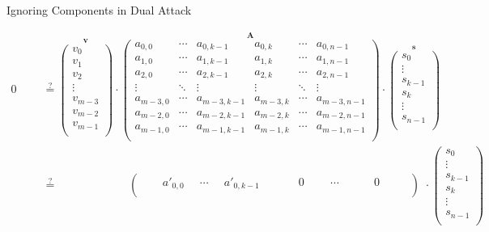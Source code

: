 \documentclass[presentation,smaller]{beamer}
\renewcommand{\vec}[1]{\ensuremath{\mathbf{#1}}\xspace}
\begin{document}
\begin{frame}[label={sec:org344f9d7}]{Ignoring Components in Dual Attack}
\begin{center}
\scriptsize
\begin{align*}
0 \phantom{xxi} &\stackrel{?}{=} \overset{\vec{v}}{\begin{pmatrix}
v_0\\
v_1\\
v_2\\
\vdots\\
v_{m-3}\\
v_{m-2}\\
v_{m-1}\\
\end{pmatrix}} \cdot 
\overset{\vec{A}}{
\left(\begin{array}{ccc|ccc} 
a_{0,0} & \cdots & a_{0,k-1} & a_{0,k} & \cdots & a_{0,n-1}\\
a_{1,0} & \cdots & a_{1,k-1} & a_{1,k} & \cdots & a_{1,n-1}\\
a_{2,0} & \cdots & a_{2,k-1} & a_{2,k} & \cdots & a_{2,n-1}\\
\vdots  & \ddots & \vdots & \vdots & \ddots & \vdots\\
a_{m-3,0} & \cdots & a_{m-3,k-1} & a_{m-3,k} & \cdots & a_{m-3,n-1}\\
a_{m-2,0} & \cdots & a_{m-2,k-1} & a_{m-2,k} & \cdots & a_{m-2,n-1}\\
a_{m-1,0} & \cdots & a_{m-1,k-1} & a_{m-1,k} & \cdots & a_{m-1,n-1}\\
\end{array}\right)} \cdot 
\overset{\vec{s}}{\begin{pmatrix}s_0\\ \vdots\\ s_{k-1}\\ \hline s_k\\ \vdots\\ s_{n-1}\\ \end{pmatrix}}\\
&\stackrel{?}{=} \phantom{\begin{pmatrix}v_m-3\end{pmatrix} \cdot\ } \left(\begin{array}{ccc|ccc} 
\phantom{xxx} a'_{0,0} \phantom{x} & \cdots & \phantom{x} a'_{0,k-1} \phantom{xi} & \phantom{xxx} 0 \phantom{xxi} & \cdots & \phantom{xxxx} 0 \phantom{xxxx}\\
\end{array}\right) \phantom{i} \cdot {\begin{pmatrix}s_0\\ \vdots\\ s_{k-1}\\ \hline s_k\\ \vdots\\ s_{n-1}\\ \end{pmatrix}}\\
\end{align*}
\end{center}
\end{frame}
\end{document}
